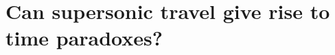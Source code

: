 \documentclass[pra,amsfonts, twocolumn]{revtex4}
\begin{document}
%
%
%
%
%

\section{Can supersonic travel give rise to time paradoxes?}
\end{document}
